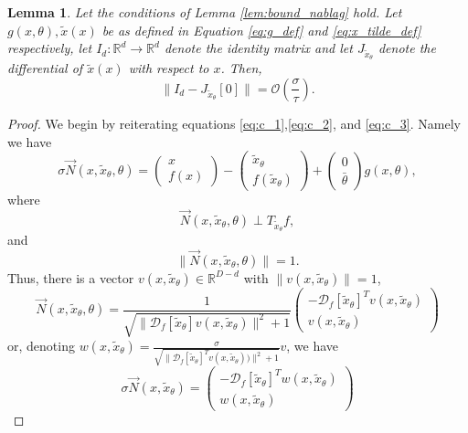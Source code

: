 \documentclass[12pt]{article}
\newtheorem{Lemma}[Theorem]{Lemma}
\theoremstyle{remark}
\newcommand{\RR}{\mathbb{R}}
\newcommand{\DD}{\mathcal{D}}
\newcommand{\OO}{\mathcal{O}}
\newcommand{\wtilde}[1]{\widetilde{#1}}
\begin{document}
\begin{appendices}
\begin{Lemma}\label{lem:bound_J}
Let the conditions of Lemma \ref{lem:bound_nablag} hold.
Let $g(x, \theta), \wtilde x(x)$ be as defined in Equation \eqref{eq:g_def} and \eqref{eq:x_tilde_def} respectively, let $I_d:\RR^d\to\RR^d$ denote the identity matrix and let $J_{\wtilde x_\theta}$ denote the differential of $\wtilde x(x)$ with respect to $x$. Then, 
\begin{equation*}
\|I_d-J_{\wtilde{x}_\theta}[0]\| = \OO(\frac{\sigma}{\tau})
.\end{equation*}    
\end{Lemma}
\begin{proof}
We begin by reiterating equations \eqref{eq:c_1},\eqref{eq:c_2}, and \eqref{eq:c_3}.
Namely we have
\begin{equation*}
\sigma \vec N(x,\wtilde{x}_\theta,\theta) = 
\left(\begin{array}{c}
     x \\
     f(x) 
\end{array}\right)
-
\left(\begin{array}{c}
     \wtilde{x}_\theta \\
     f(\wtilde{x}_\theta) 
\end{array}\right)
+ 
\left(\begin{array}{c}
     0 \\
     \bar \theta
\end{array}\right) g(x,\theta)
,\end{equation*}
where
\begin{equation*}
 \vec N(x,\wtilde{x}_\theta,\theta) \perp T_{\wtilde{x}_\theta}f
,\end{equation*}
and 
\begin{equation*}
\|\vec N(x,\wtilde{x}_\theta,\theta) \| = 1
.\end{equation*}
Thus, there is a vector $v(x,\wtilde x_\theta)\in \RR^{D-d}$ with $\|v(x,\wtilde x_\theta)\| = 1$,
\[
\vec N(x,\wtilde{x}_\theta,\theta) = \frac{1}{\sqrt{\|\DD_f[\wtilde{x}_\theta] v(x,\wtilde x_\theta)\|^2 + 1}} 
\left(\begin{array}{c}
     -\DD_f[\wtilde{x}_\theta]^T v(x,\wtilde x_\theta) \\
     v(x,\wtilde x_\theta)
\end{array}\right)
\]
or, denoting $ w(x,\wtilde x_\theta) = \frac{\sigma}{\sqrt{\|\DD_f[\wtilde{x}_\theta]^T v(x,\wtilde x_\theta))\|^2 + 1}}  v$, we have 
\[
\sigma \vec N(x,\wtilde{x}_\theta) = 
\left(\begin{array}{c}
     -\DD_f[\wtilde{x}_\theta]^T  w(x,\wtilde x_\theta) \\
     w(x,\wtilde x_\theta)
\end{array}\right)
\]


\end{proof}
\end{appendices}
\end{document}
